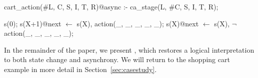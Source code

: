 \begin{Dedalus}
cart_action(#L, C, S, I, T, R)@async :-
  ca_stage(L, #C, S, I, T, R);

s(0);
s(X+1)@next \(\leftarrow\)  s(X), action(_, _, _, _, _);
s(X)@next \(\leftarrow\)  s(X), \(\lnot\) action(_, _, _, _, _);
\end{Dedalus}

In the remainder of the paper, we present \lang, which restores a logical interpretation to
both state change and asynchrony.  We will return to the shopping cart example in more detail 
in Section~\ref{sec:casestudy}.


